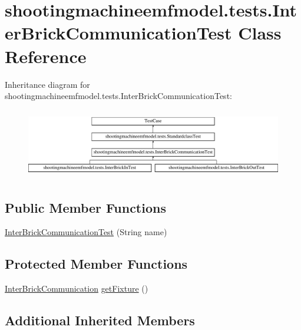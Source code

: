 \hypertarget{classshootingmachineemfmodel_1_1tests_1_1_inter_brick_communication_test}{\section{shootingmachineemfmodel.\-tests.\-Inter\-Brick\-Communication\-Test Class Reference}
\label{classshootingmachineemfmodel_1_1tests_1_1_inter_brick_communication_test}
}
Inheritance diagram for shootingmachineemfmodel.\-tests.\-Inter\-Brick\-Communication\-Test\-:\begin{figure}[H]
\begin{center}
\leavevmode
\includegraphics[height=3.093923cm]{classshootingmachineemfmodel_1_1tests_1_1_inter_brick_communication_test}
\end{center}
\end{figure}
\subsection*{Public Member Functions}
\begin{DoxyCompactItemize}
\item 
\hyperlink{classshootingmachineemfmodel_1_1tests_1_1_inter_brick_communication_test_ae2301c47996bc198f0588d73e170d05d}{Inter\-Brick\-Communication\-Test} (String name)
\end{DoxyCompactItemize}
\subsection*{Protected Member Functions}
\begin{DoxyCompactItemize}
\item 
\hyperlink{interfaceshootingmachineemfmodel_1_1_inter_brick_communication}{Inter\-Brick\-Communication} \hyperlink{classshootingmachineemfmodel_1_1tests_1_1_inter_brick_communication_test_aa8010cef7ac6657eefa5211c9f0da71e}{get\-Fixture} ()
\end{DoxyCompactItemize}
\subsection*{Additional Inherited Members}


